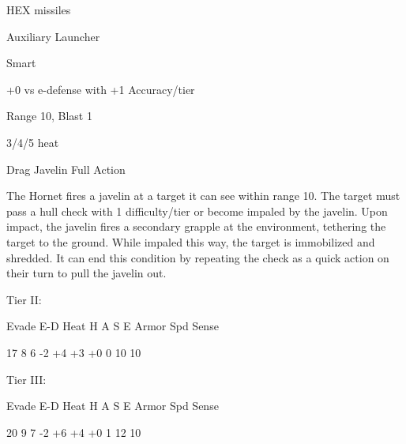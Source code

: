 HEX missiles

Auxiliary Launcher

Smart

+0 vs e-defense with +1 Accuracy/tier

Range 10, Blast 1

3/4/5 heat


Drag Javelin
Full Action

The Hornet fires a javelin at a target it can see within range 10. The target must pass a hull check
with 1 difficulty/tier or become impaled by the javelin. Upon impact, the javelin fires a secondary
grapple at the environment, tethering the target to the ground. While impaled this way, the target
is immobilized and shredded. It can end this condition by repeating the check as a quick action
on their turn to pull the javelin out.


Tier II:


          Evade     E-D    Heat    H     A     S     E       Armor         Spd      Sense

          17        8      6       -2    +4    +3    +0      0             10       10

Tier III:


          Evade     E-D    Heat    H     A     S     E       Armor         Spd      Sense

          20        9      7       -2    +6    +4    +0       1            12       10


